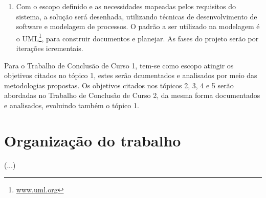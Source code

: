 \begin{enumerate}
	\item{Com o escopo definido e as necessidades mapeadas pelos requisitos do sistema, a solução será desenhada, utilizando técnicas de desenvolvimento de software e modelagem de processos. O padrão a ser utilizado na modelagem é o UML\footnote{\url{www.uml.org}}, para construir documentos e planejar. As fases do projeto serão por iterações icrementais.}

	\end{enumerate}

Para o Trabalho de Conclusão de Curso 1, tem-se como escopo atingir os objetivos citados no tópico 1, estes serão dcumentados e analisados por meio das metodologias propostas. Os objetivos citados nos tópicos 2, 3, 4 e 5 serão abordadas no Trabalho de Conclusão de Curso 2, da mesma forma documentados e analisados, evoluindo também o tópico 1.

\section{Organização do trabalho}
(...)





